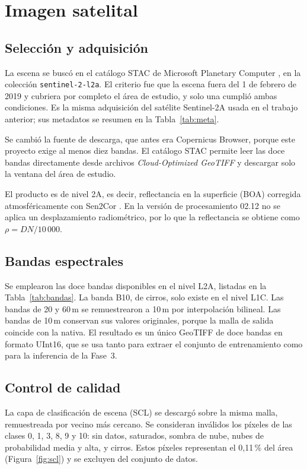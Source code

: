 \documentclass{article}
\begin{document}
\section{Imagen satelital}

\subsection{Selección y adquisición}
La escena se buscó en el catálogo STAC de Microsoft Planetary Computer \parencite{PlanetaryComputer}, en la colección \texttt{sentinel-2-l2a}. El criterio fue que la escena fuera del 1 de febrero de 2019 y cubriera por completo el área de estudio, y solo una cumplió ambas condiciones. Es la misma adquisición del satélite Sentinel-2A usada en el trabajo anterior; sus metadatos se resumen en la Tabla~\ref{tab:meta}.

Se cambió la fuente de descarga, que antes era Copernicus Browser, porque este proyecto exige al menos diez bandas. El catálogo STAC permite leer las doce bandas directamente desde archivos \emph{Cloud-Optimized GeoTIFF} y descargar solo la ventana del área de estudio.



El producto es de nivel 2A, es decir, reflectancia en la superficie (BOA) corregida atmosféricamente con Sen2Cor \parencite{MainKnorn2017}. En la versión de procesamiento 02.12 no se aplica un desplazamiento radiométrico, por lo que la reflectancia se obtiene como $\rho = DN / 10\,000$.

\subsection{Bandas espectrales}
Se emplearon las doce bandas disponibles en el nivel L2A, listadas en la Tabla~\ref{tab:bandas}. La banda B10, de cirros, solo existe en el nivel L1C. Las bandas de 20 y 60\,m se remuestrearon a 10\,m por interpolación bilineal. Las bandas de 10\,m conservan sus valores originales, porque la malla de salida coincide con la nativa. El resultado es un único GeoTIFF de doce bandas en formato UInt16, que se usa tanto para extraer el conjunto de entrenamiento como para la inferencia de la Fase~3.



\subsection{Control de calidad}
La capa de clasificación de escena (SCL) se descargó sobre la misma malla, remuestreada por vecino más cercano. Se consideran inválidos los píxeles de las clases 0, 1, 3, 8, 9 y 10: sin datos, saturados, sombra de nube, nubes de probabilidad media y alta, y cirros. Estos píxeles representan el 0{,}11\,\% del área (Figura~\ref{fig:scl}) y se excluyen del conjunto de datos.
\end{document}
